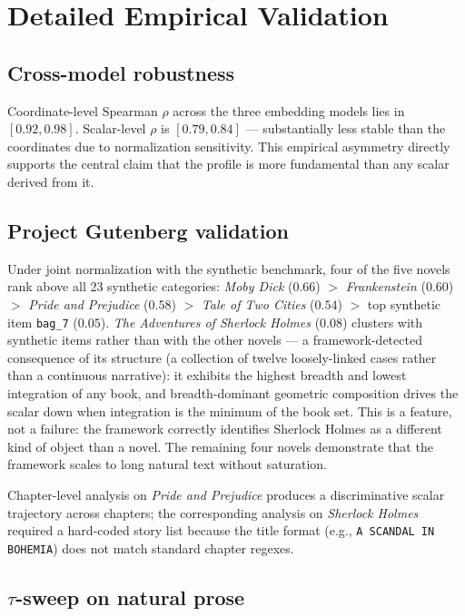 \documentclass[11pt]{article}
\begin{document}
\section{Detailed Empirical Validation}\label{app:validation}

\subsection{Cross-model robustness}

Coordinate-level Spearman $\rho$ across the three embedding models lies in $[0.92, 0.98]$. Scalar-level $\rho$ is $[0.79, 0.84]$ --- substantially less stable than the coordinates due to normalization sensitivity. This empirical asymmetry directly supports the central claim that the profile is more fundamental than any scalar derived from it.

\subsection{Project Gutenberg validation}

Under joint normalization with the synthetic benchmark, four of the five novels rank above all 23 synthetic categories: \emph{Moby Dick} ($0.66$) $>$ \emph{Frankenstein} ($0.60$) $>$ \emph{Pride and Prejudice} ($0.58$) $>$ \emph{Tale of Two Cities} ($0.54$) $>$ top synthetic item \texttt{bag\_7} ($0.05$). \emph{The Adventures of Sherlock Holmes} ($0.08$) clusters with synthetic items rather than with the other novels --- a framework-detected consequence of its structure (a collection of twelve loosely-linked cases rather than a continuous narrative): it exhibits the highest breadth and lowest integration of any book, and breadth-dominant geometric composition drives the scalar down when integration is the minimum of the book set. This is a feature, not a failure: the framework correctly identifies Sherlock Holmes as a different kind of object than a novel. The remaining four novels demonstrate that the framework scales to long natural text without saturation.

Chapter-level analysis on \emph{Pride and Prejudice} produces a discriminative scalar trajectory across chapters; the corresponding analysis on \emph{Sherlock Holmes} required a hard-coded story list because the title format (e.g., \texttt{A SCANDAL IN BOHEMIA}) does not match standard chapter regexes.

\subsection{$\tau$-sweep on natural prose}
\end{document}

